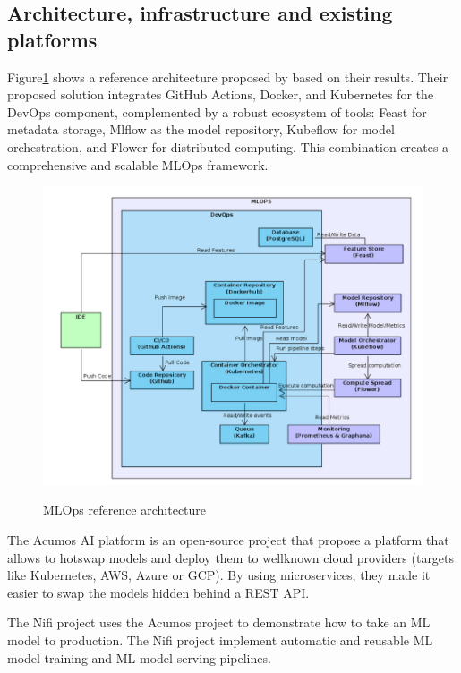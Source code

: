 \subsection{Architecture, infrastructure and existing platforms}\label{subsec:architecture-infrastructure-and-existing-platforms}
Figure\ref{fig:infra} shows a reference architecture proposed by\cite{10855428} based on their results.
Their proposed solution integrates GitHub Actions, Docker, and Kubernetes for the DevOps component, complemented by a robust ecosystem of tools:
Feast for metadata storage, Mlflow as the model repository, Kubeflow for model orchestration, and Flower for distributed computing.
This combination creates a comprehensive and scalable MLOps framework.

\begin{figure}[!htbp]
    \caption{MLOps reference architecture\cite{10855428}}
    \centering
    \includegraphics[scale=0.35]{images/infrastructure}
    \label{fig:infra}
\end{figure}


The Acumos AI platform\cite{10690392} is an open-source project that propose a platform that allows to hotswap models and deploy
them to wellknown cloud providers (targets like Kubernetes, AWS, Azure or GCP).
By using microservices, they made it easier to swap the models hidden behind a REST API\@.

The Nifi project\cite{10346079} uses the Acumos project to demonstrate how to take an ML model
to production.
The Nifi project implement automatic and reusable ML model training and ML model serving pipelines.

